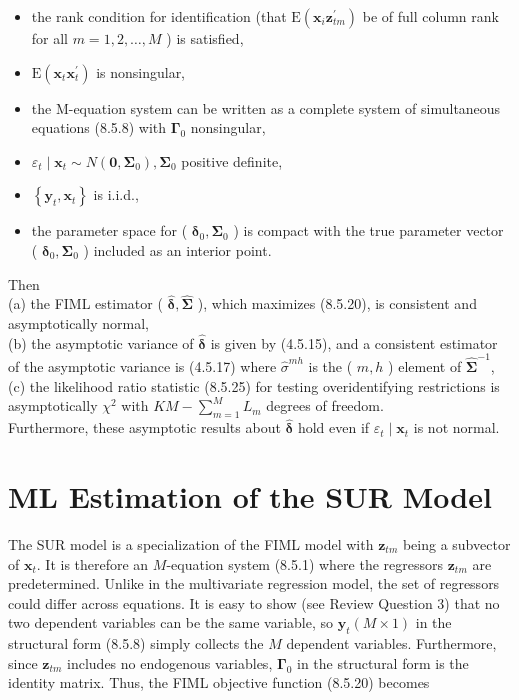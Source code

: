 \documentclass[10pt]{article}
\begin{document}
\begin{itemize}
  \item the rank condition for identification (that $\mathrm{E}\left(\mathbf{x}_{i} \mathbf{z}_{t m}^{\prime}\right)$ be of full column rank for all $m=1,2, \ldots, M$ ) is satisfied,
  \item $\mathrm{E}\left(\mathbf{x}_{t} \mathbf{x}_{t}^{\prime}\right)$ is nonsingular,
  \item the M-equation system can be written as a complete system of simultaneous equations (8.5.8) with $\boldsymbol{\Gamma}_{0}$ nonsingular,
  \item $\varepsilon_{t} \mid \mathbf{x}_{t} \sim N\left(\mathbf{0}, \boldsymbol{\Sigma}_{0}\right), \boldsymbol{\Sigma}_{0}$ positive definite,
  \item $\left\{\mathbf{y}_{t}, \mathbf{x}_{t}\right\}$ is i.i.d.,
  \item the parameter space for ( $\boldsymbol{\delta}_{0}, \boldsymbol{\Sigma}_{0}$ ) is compact with the true parameter vector ( $\boldsymbol{\delta}_{0}, \boldsymbol{\Sigma}_{0}$ ) included as an interior point.
\end{itemize}

Then\\
(a) the FIML estimator ( $\hat{\boldsymbol{\delta}}, \widehat{\mathbf{\Sigma}}$ ), which maximizes (8.5.20), is consistent and asymptotically normal,\\
(b) the asymptotic variance of $\hat{\boldsymbol{\delta}}$ is given by (4.5.15), and a consistent estimator of the asymptotic variance is (4.5.17) where $\hat{\sigma}^{m h}$ is the ( $m, h$ ) element of $\widehat{\mathbf{\Sigma}}^{-1}$,\\
(c) the likelihood ratio statistic (8.5.25) for testing overidentifying restrictions is asymptotically $\chi^{2}$ with $K M-\sum_{m=1}^{M} L_{m}$ degrees of freedom.\\
Furthermore, these asymptotic results about $\hat{\boldsymbol{\delta}}$ hold even if $\varepsilon_{t} \mid \mathbf{x}_{t}$ is not normal.

\section*{ML Estimation of the SUR Model}
The SUR model is a specialization of the FIML model with $\mathbf{z}_{t m}$ being a subvector of $\mathbf{x}_{t}$. It is therefore an $M$-equation system (8.5.1) where the regressors $\mathbf{z}_{t m}$ are predetermined. Unlike in the multivariate regression model, the set of regressors could differ across equations. It is easy to show (see Review Question 3) that no two dependent variables can be the same variable, so $\mathbf{y}_{t}(M \times 1)$ in the structural form (8.5.8) simply collects the $M$ dependent variables. Furthermore, since $\mathbf{z}_{t m}$ includes no endogenous variables, $\boldsymbol{\Gamma}_{0}$ in the structural form is the identity matrix. Thus, the FIML objective function (8.5.20) becomes
\end{document}
